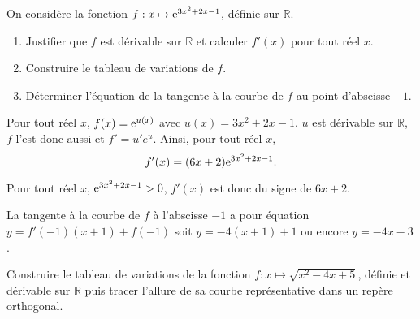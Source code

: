 \documentclass[11pt,fleqn, openany]{book} %
\begin{document}
\begin{exercise}[topic=der03]On considère la fonction $f:x\mapsto \mathrm{e}^{3x^2+2x-1}$, définie sur $\mathbb{R}$.
\begin{enumerate}
\item Justifier que $f$ est dérivable sur $\mathbb{R}$ et calculer $f'(x)$ pour tout réel $x$.
\item Construire le tableau de variations de $f$.
\item Déterminer l'équation de la tangente à la courbe de $f$ au point d'abscisse $-1$.
\end{enumerate}
\newpage \end{exercise}

\begin{solution}Pour tout réel $x$, $f(x)=\mathrm{e}^{u(x)}$ avec $u(x)=3x^2+2x-1$. $u$ est dérivable sur $\mathbb{R}$, $f$ l'est donc aussi et $f'=u'e^u$. Ainsi, pour tout réel $x$, 
\[f'(x)=(6x+2)\mathrm{e}^{3x^2+2x-1}.\]

Pour tout réel $x$, $\mathrm{e}^{3x^2+2x-1}>0$, $f'(x)$ est donc du signe de $6x+2$.

\begin{center}
\end{center}

La tangente à la courbe de $f$ à l'abscisse $-1$ a pour équation $y=f'(-1)(x+1)+f(-1)$ soit $y=-4(x+1)+1$ ou encore $y=-4x-3$.\end{solution}




\begin{exercise}[topic=der03]Construire le tableau de variations de la fonction $f:x\mapsto \sqrt{x^2-4x+5}$, définie et dérivable sur $\mathbb{R}$  puis tracer l'allure de sa courbe représentative dans un repère orthogonal.\end{exercise}
\end{document}
